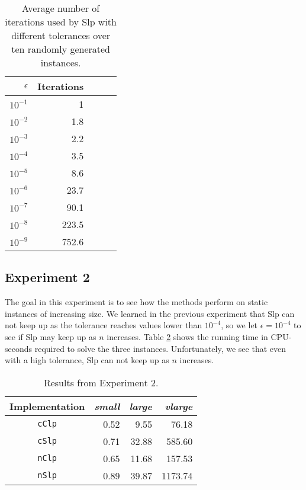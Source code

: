 \begin{table}[ht!]
\centering
\caption{Average number of iterations used by Slp with different tolerances
         over ten randomly generated instances.}
\label{table:expiters}
\begin{tabular}{rrrrr}
$\epsilon$ & Iterations \\ \hline
$10^{-1}$  & 1 \\
$10^{-2}$  & 1.8 \\
$10^{-3}$  & 2.2 \\
$10^{-4}$  & 3.5 \\
$10^{-5}$  & 8.6 \\
$10^{-6}$  & 23.7 \\
$10^{-7}$  & 90.1 \\
$10^{-8}$  & 223.5 \\
$10^{-9}$  & 752.6
\end{tabular}
\end{table}

\subsection*{Experiment 2}
The goal in this experiment is to see how the methods perform on static instances
of increasing size.
We learned in the previous experiment that Slp can not keep up as the tolerance
reaches values lower than $10^{-4}$, so we let $\epsilon = 10^{-4}$ to see if
Slp may keep up as $n$ increases.
Table \ref{table:eps4instances} shows the running time in CPU-seconds required
to solve the three instances.
Unfortunately, we see that even with a high tolerance, Slp can not keep up as
$n$ increases.

\begin{table}
\centering
\caption{Results from Experiment 2.}
\label{table:eps4instances}
\begin{tabular}{crrr}
\textrm{Implementation} & \textit{small} & \textit{large} & \textit{vlarge} \\ \hline
\texttt{cClp}           & 0.52           & 9.55           & 76.18 \\
\texttt{cSlp}           & 0.71           & 32.88          & 585.60 \\
\texttt{nClp}           & 0.65           & 11.68          & 157.53 \\
\texttt{nSlp}           & 0.89           & 39.87          & 1173.74
\end{tabular}
\end{table}

